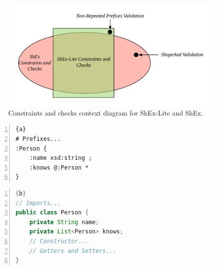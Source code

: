 \begin{figure}
  \includegraphics[width=\textwidth]{images/shex-lite-constraints-context.png}
  \centering
  \caption[Constraints and checks context diagram for ShEx-Lite and ShEx.]{Constraints
  and checks context diagram for ShEx-Lite and ShEx.}
  \label{fig:constraints-context}
\end{figure}

\begin{center}
	\noindent\begin{minipage}[t]{.4\textwidth}
		\begin{lstlisting}[frame=topline,numbers=left,title=\scriptsize\texttt{Person.shexl}, basicstyle=\ttfamily\scriptsize]{a}
# Prefixes...
:Person {
	:name xsd:string ;
	:knows @:Person *
}
		\end{lstlisting}
	\end{minipage}\hfill
	\begin{minipage}[t]{.5\textwidth}
		\begin{lstlisting}[language=Java, frame=t,numbers=left,title=\scriptsize\texttt{Person.java}, basicstyle=\ttfamily\scriptsize]{b}
// Imports...
public class Person {
	private String name;
	private List<Person> knows;
	// Constructor...
	// Getters and Setters...
}
		\end{lstlisting}
	\end{minipage}
	\label{fig:example-1}
\end{center}